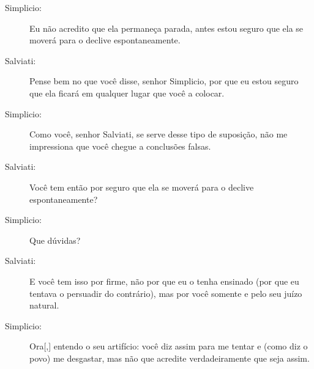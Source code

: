 \begin{description}
\item[Simplicio:] Eu não acredito que ela permaneça parada, antes estou seguro que ela se moverá para o declive espontaneamente.

\item[Salviati:] Pense bem no que você disse, senhor Simplicio, por que eu estou seguro que ela ficará em qualquer lugar que você a colocar.

\item[Simplicio:] Como você, senhor Salviati, se serve desse tipo de suposição, não me impressiona que você chegue a conclusões falsas.

\item[Salviati:] Você tem então por seguro que ela se moverá para o declive espontaneamente?

\item[Simplicio:] Que dúvidas?

\item[Salviati:] E você tem isso por firme, não por que eu o tenha ensinado (por que eu tentava o persuadir do contrário), mas por você somente e pelo seu juízo natural.

\item[Simplicio:] Ora[,] entendo o seu artifício: você diz assim para me tentar e (como diz o povo) me desgastar, mas não que acredite verdadeiramente que seja assim. 


\end{description}

